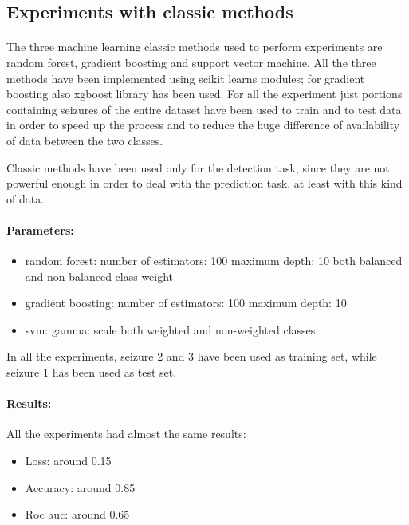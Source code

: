 \subsection{Experiments with classic methods}
\paragraph{} The three machine learning classic methods used to perform experiments are random forest, gradient boosting and support vector machine. All the three methods have been implemented using scikit learns modules; for gradient boosting also xgboost library has been used. For all the experiment just portions containing seizures of the entire dataset have been used to train and to test data in order to speed up the process and to reduce the huge difference of availability of data between the two classes.

Classic methods have been used only for the detection task, since they are not powerful enough in order to deal with the prediction task, at least with this kind of data.

\paragraph{Parameters:}
\begin{itemize}
    \item random forest:
        \subitem number of estimators: 100
        \subitem maximum depth: 10
        \subitem both balanced and non-balanced class weight
    \item gradient boosting:
        \subitem number of estimators: 100
        \subitem maximum depth: 10
    \item svm:
        \subitem gamma: scale
        \subitem both weighted and non-weighted classes
\end{itemize}

In all the experiments, seizure 2 and 3 have been used as training set, while seizure 1 has been used as test set.

\paragraph{Results:} All the experiments had almost the same results:
\begin{itemize}
    \item Loss: around 0.15
    \item Accuracy: around 0.85
    \item Roc auc: around 0.65
\end{itemize}

